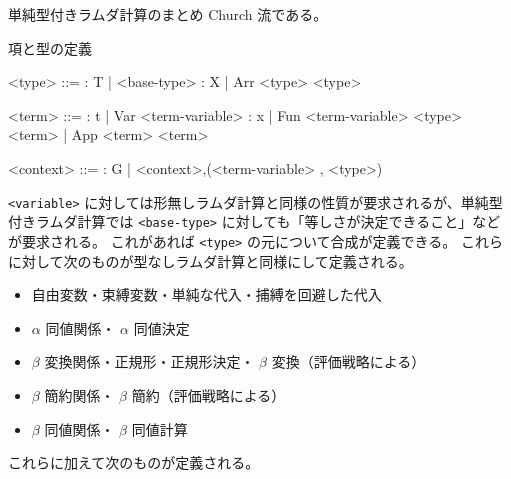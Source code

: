 \documentclass[dvipdfmx]{jsarticle}
\begin{document}
単純型付きラムダ計算のまとめ
Church 流である。

\begin{itembox}[l]{項と型の定義}
  \begin{bnfgrammar}
    <type> ::= : T
    | <base-type> : X
    | Arr <type> <type>
  \end{bnfgrammar}
  \begin{bnfgrammar}
    <term> ::= : t 
    | Var <term-variable> : x
    | Fun <term-variable> <type> <term>
    | App <term> <term>
  \end{bnfgrammar}
  \begin{bnfgrammar}
    <context> ::= : G
    | <context>,(<term-variable> , <type>)
  \end{bnfgrammar}
\end{itembox}

\texttt{<variable>} に対しては形無しラムダ計算と同様の性質が要求されるが、単純型付きラムダ計算では \texttt{<base-type>} に対しても「等しさが決定できること」などが要求される。
これがあれば \texttt{<type>} の元について合成が定義できる。
これらに対して次のものが型なしラムダ計算と同様にして定義される。
\begin{itemize}
  \item 自由変数・束縛変数・単純な代入・捕縛を回避した代入
  \item \(\alpha\) 同値関係・ \(\alpha\) 同値決定
  \item \(\beta\) 変換関係・正規形・正規形決定・ \(\beta\) 変換（評価戦略による）
  \item \(\beta\) 簡約関係・ \(\beta\) 簡約（評価戦略による）
  \item \(\beta\) 同値関係・ \(\beta\) 同値計算
\end{itemize}

これらに加えて次のものが定義される。
\end{document}
